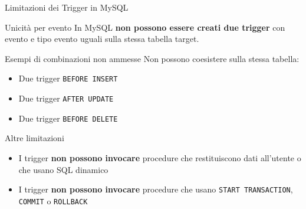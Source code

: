 \documentclass[aspectratio=169]{beamer}
\begin{document}
\begin{frame}{Limitazioni dei Trigger in MySQL}
  \begin{alertblock}{Unicità per evento}
    In MySQL \textbf{non possono essere creati due trigger} con evento e tipo
    evento uguali sulla stessa tabella target.
  \end{alertblock}
  \vspace{0.3cm}
  \begin{exampleblock}{Esempi di combinazioni non ammesse}
    Non possono coesistere sulla stessa tabella:
    \begin{itemize}
      \item Due trigger \texttt{BEFORE INSERT}
      \item Due trigger \texttt{AFTER UPDATE}
      \item Due trigger \texttt{BEFORE DELETE}
    \end{itemize}
  \end{exampleblock}
  \vspace{0.3cm}
  \begin{block}{Altre limitazioni}
    \begin{itemize}
      \item I trigger \textbf{non possono invocare} procedure che restituiscono
            dati all'utente o che usano SQL dinamico
      \item I trigger \textbf{non possono invocare} procedure che usano
            \texttt{START TRANSACTION}, \texttt{COMMIT} o \texttt{ROLLBACK}
    \end{itemize}
  \end{block}
\end{frame}
\end{document}
